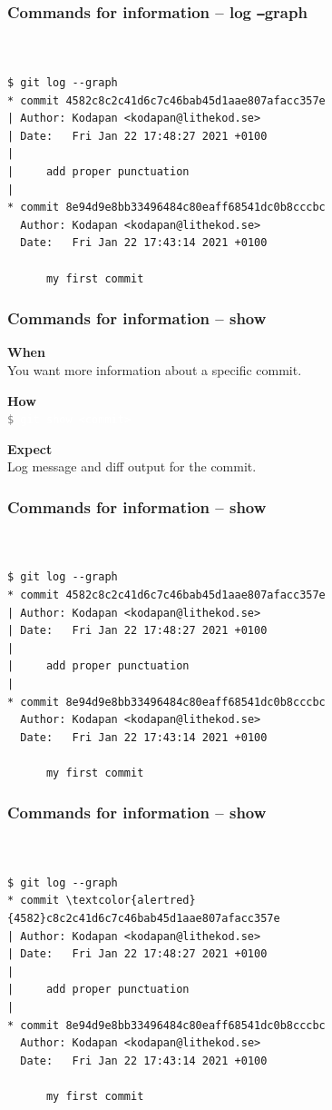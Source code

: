 \documentclass{beamer}
\newcommand{\keyword}[1]{\hspace{-1.0em}\textcolor{lkblue}{\textbf{#1}}\vspace{0.2em}} %
\newcommand{\command}[1]{\colorbox{black!78}{\vphantom{Ep}\texttt{\textcolor{gray}{\$}
\textcolor{white}{#1}}}}
\begin{document}
\begin{frame}[fragile]
  \frametitle{Commands for information -- log \texttt{--}graph}
\begin{Verbatim}[commandchars=\\\{\}]


$ git log --graph
* commit 4582c8c2c41d6c7c46bab45d1aae807afacc357e
| Author: Kodapan <kodapan@lithekod.se>
| Date:   Fri Jan 22 17:48:27 2021 +0100
| 
|     add proper punctuation
| 
* commit 8e94d9e8bb33496484c80eaff68541dc0b8cccbc
  Author: Kodapan <kodapan@lithekod.se>
  Date:   Fri Jan 22 17:43:14 2021 +0100
  
      my first commit
\end{Verbatim}
\end{frame}

\begin{frame}
  \frametitle{Commands for information -- show}

  \keyword{When}\\
  You want more information about a specific commit.
  \vspace{0.5em}

  \keyword{How}\\
  \command{git show <commit>}
  \vspace{0.5em}

  \keyword{Expect}\\
  Log message and diff output for the commit.
\end{frame}

\begin{frame}[fragile]
  \frametitle{Commands for information -- show}
\begin{Verbatim}[commandchars=\\\{\}]


$ git log --graph
* commit 4582c8c2c41d6c7c46bab45d1aae807afacc357e
| Author: Kodapan <kodapan@lithekod.se>
| Date:   Fri Jan 22 17:48:27 2021 +0100
| 
|     add proper punctuation
| 
* commit 8e94d9e8bb33496484c80eaff68541dc0b8cccbc
  Author: Kodapan <kodapan@lithekod.se>
  Date:   Fri Jan 22 17:43:14 2021 +0100
  
      my first commit
\end{Verbatim}
\end{frame}

\begin{frame}[fragile]
  \frametitle{Commands for information -- show}
\begin{Verbatim}[commandchars=\\\{\}]


$ git log --graph
* commit \textcolor{alertred}{4582}c8c2c41d6c7c46bab45d1aae807afacc357e
| Author: Kodapan <kodapan@lithekod.se>
| Date:   Fri Jan 22 17:48:27 2021 +0100
| 
|     add proper punctuation
| 
* commit 8e94d9e8bb33496484c80eaff68541dc0b8cccbc
  Author: Kodapan <kodapan@lithekod.se>
  Date:   Fri Jan 22 17:43:14 2021 +0100
  
      my first commit
\end{Verbatim}
\end{frame}
\end{document}
